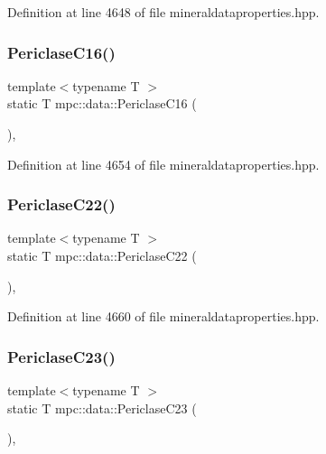 Definition at line 4648 of file mineraldataproperties.\+hpp.

\mbox{\label{namespacempc_1_1data_aa1d9afc61cef9e96ef2d73a4139d1df2}} 
\subsubsection{\texorpdfstring{Periclase\+C16()}{PericlaseC16()}}
{\footnotesize\ttfamily template$<$typename T $>$ \\
static T mpc\+::data\+::\+Periclase\+C16 (\begin{DoxyParamCaption}{ }\end{DoxyParamCaption})\hspace{0.3cm}{\ttfamily [inline]}, {\ttfamily [static]}}



Definition at line 4654 of file mineraldataproperties.\+hpp.

\mbox{\label{namespacempc_1_1data_a2fbd86b33193ff286eff699b80b71071}} 
\subsubsection{\texorpdfstring{Periclase\+C22()}{PericlaseC22()}}
{\footnotesize\ttfamily template$<$typename T $>$ \\
static T mpc\+::data\+::\+Periclase\+C22 (\begin{DoxyParamCaption}{ }\end{DoxyParamCaption})\hspace{0.3cm}{\ttfamily [inline]}, {\ttfamily [static]}}



Definition at line 4660 of file mineraldataproperties.\+hpp.

\mbox{\label{namespacempc_1_1data_aebdff55c942386f876f1ced5df603987}} 
\subsubsection{\texorpdfstring{Periclase\+C23()}{PericlaseC23()}}
{\footnotesize\ttfamily template$<$typename T $>$ \\
static T mpc\+::data\+::\+Periclase\+C23 (\begin{DoxyParamCaption}{ }\end{DoxyParamCaption})\hspace{0.3cm}{\ttfamily [inline]}, {\ttfamily [static]}}



